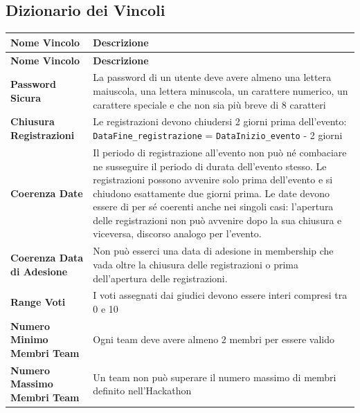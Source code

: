 \documentclass[a4paper, 10pt]{article}
\renewcommand{\arraystretch}{1.2} %
\begin{document}
	\subsection{Dizionario dei Vincoli}
	{\footnotesize
		\setlength{\arrayrulewidth}{0.5pt}
		\renewcommand{\arraystretch}{1.5}
		\begin{longtable}{
				>{\raggedright\arraybackslash}p{5.5cm}
				>{\raggedright\arraybackslash}p{10cm}
			}
			\hline
			\textbf{Nome Vincolo} & \textbf{Descrizione} \\
			\hline
			\endfirsthead
			\hline
			\textbf{Nome Vincolo} & \textbf{Descrizione} \\
			\hline
			\endhead
			\hline
			\endfoot
			\hline
			\endlastfoot
			
			\textbf{Password Sicura} &
			La password di un utente deve avere almeno una lettera maiuscola, una lettera minuscola, un carattere numerico, un carattere speciale e che non sia più breve di 8 caratteri \\
			\hline
			
			\textbf{Chiusura Registrazioni} &
			Le registrazioni devono chiudersi 2 giorni prima dell'evento:
			\texttt{DataFine\_registrazione} = \texttt{DataInizio\_evento} - 2 giorni \\
			\hline
			
			\textbf{Coerenza Date} &
			Il periodo di registrazione all'evento non può né combaciare ne susseguire il periodo di durata dell'evento stesso.
			Le registrazioni possono avvenire solo prima dell'evento e si chiudono esattamente due giorni prima.
			Le date devono essere di per sé coerenti anche nei singoli casi: l'apertura delle registrazioni non può avvenire dopo
			la sua chiusura e viceversa, discorso analogo per l'evento.\\
			\hline
			
			\textbf{Coerenza Data di Adesione} &
			Non può esserci una data di adesione in membership che vada oltre la chiusura delle registrazioni o prima dell'apertura delle registrazioni.\\
			\hline
			
			\textbf{Range Voti} &
			I voti assegnati dai giudici devono essere interi compresi tra 0 e 10\\
			\hline
			
			\textbf{Numero Minimo Membri Team} &
			Ogni team deve avere almeno 2 membri per essere valido \\
			\hline
			
			\textbf{Numero Massimo Membri Team} &
			Un team non può superare il numero massimo di membri definito nell'Hackathon \\
			\hline
			

\end{longtable}}
\end{document}
